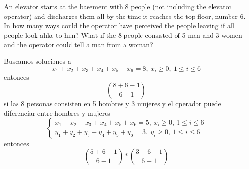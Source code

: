 \item An elevator starts at the basement with 8 people (not including the elevator operator) and discharges them all by the time it reaches the top floor, number 6. In how many ways could the operator have perceived the people leaving if all people look alike to him? What if the 8 people consisted of 5 men and 3 women and the operator could tell a man from a woman?

Buscamos soluciones a
\[ x_1 + x_2 + x_3 + x_4 + x_5 + x_6 = 8,\ x_i \ge 0,\ 1 \le i \le 6 \]
entonces
\[ \binom{8+6-1}{6-1} \]
si las 8 personas consisten en 5 hombres y 3 mujeres y el operador puede diferenciar entre hombres y mujeres
\[ 
\begin{cases}
    x_1 + x_2 + x_3 + x_4 + x_5 + x_6 = 5,\ x_i \ge 0,\ 1 \le i \le 6\\
    y_1 + y_2 + y_3 + y_4 + y_5 + y_6 = 3,\ y_i \ge 0,\ 1 \le i \le 6
\end{cases}
\]
entonces
\[ \binom{5+6-1}{6-1} * \binom{3+6-1}{6-1} \]